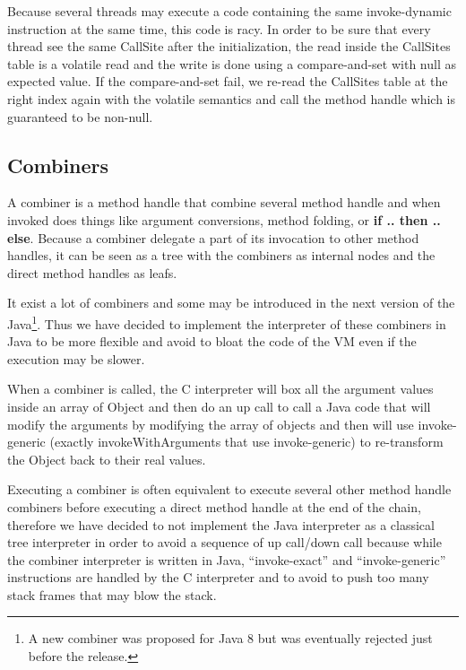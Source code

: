 \documentclass{sig-alternate}
\begin{document}
      Because several threads may execute a code containing the same invoke-dynamic instruction
      at the same time, this code is racy. In order to be sure that every thread see the same CallSite
      after the initialization, the read inside the CallSites table is a volatile read and the write
      is done using a compare-and-set with null as expected value.
      If the compare-and-set fail, we re-read the CallSites table at the right index again with the volatile semantics
      and call the method handle which is guaranteed to be non-null.   



    \subsection{Combiners}
    \label{combiners}

      A combiner is a method handle that combine several method handle and when invoked
      does things like argument conversions, method folding, or {\bf if .. then .. else}.
      Because a combiner delegate a part of its invocation to other method handles,
      it can be seen as a tree with the combiners as internal nodes and the direct
      method handles as leafs.

      It exist a lot of combiners and some may be introduced in the next version
      of the Java\footnote{A new combiner was proposed for Java 8 but was eventually rejected just before the release.}.
      Thus we have decided to implement the interpreter of these combiners in Java
      to be more flexible and avoid to bloat the code of the VM even if the execution may be slower.
      
      When a combiner is called, the C interpreter will box all the argument values inside an array of Object
      and then do an up call to call a Java code that will modify the arguments by modifying the array
      of objects and then will use invoke-generic (exactly invokeWithArguments that use invoke-generic)
      to re-transform the Object back to their real values.  

      Executing a combiner is often equivalent to execute several other method handle
      combiners before executing a direct method handle at the end of the chain,
      therefore we have decided to not implement the Java interpreter as a classical
      tree interpreter in order to avoid a sequence of up call/down call because while
      the combiner interpreter is written in Java, ``invoke-exact'' and ``invoke-generic'' instructions
      are handled by the C interpreter and to avoid to push too many stack frames that may blow the stack.
      
\end{document}
